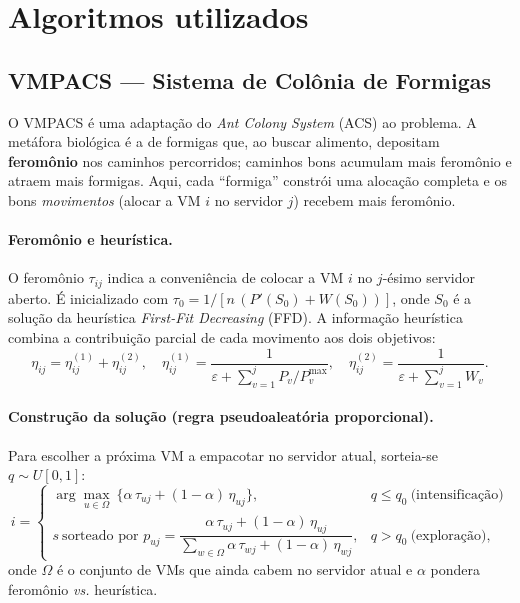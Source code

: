 \documentclass[11pt]{article}
\begin{document}
\section{Algoritmos utilizados}
\subsection{VMPACS --- Sistema de Colônia de Formigas}
O VMPACS é uma adaptação do \emph{Ant Colony System} (ACS) ao problema. A
metáfora biológica é a de formigas que, ao buscar alimento, depositam
\textbf{feromônio} nos caminhos percorridos; caminhos bons acumulam mais
feromônio e atraem mais formigas. Aqui, cada ``formiga'' constrói uma alocação
completa e os bons \emph{movimentos} (alocar a VM $i$ no servidor $j$) recebem
mais feromônio.

\paragraph{Feromônio e heurística.} O feromônio $\tau_{ij}$ indica a
conveniência de colocar a VM $i$ no $j$-ésimo servidor aberto. É inicializado com
$\tau_{0}=1/\!\left[n\,(P'(S_{0})+W(S_{0}))\right]$, onde $S_{0}$ é a solução da
heurística \emph{First-Fit Decreasing} (FFD). A informação heurística combina a
contribuição parcial de cada movimento aos dois objetivos:
\begin{equation}
  \eta_{ij}=\eta_{ij}^{(1)}+\eta_{ij}^{(2)},\quad
  \eta_{ij}^{(1)}=\frac{1}{\varepsilon+\sum_{v=1}^{j} P_{v}/P^{\max}_{v}},\quad
  \eta_{ij}^{(2)}=\frac{1}{\varepsilon+\sum_{v=1}^{j} W_{v}}.
  \label{eq:eta}
\end{equation}

\paragraph{Construção da solução (regra pseudoaleatória proporcional).} Para
escolher a próxima VM a empacotar no servidor atual, sorteia-se $q\sim U[0,1]$:
\begin{equation}
  i=\begin{cases}
     \displaystyle\arg\max_{u\in\Omega}\ \{\alpha\,\tau_{uj}+(1-\alpha)\,\eta_{uj}\}, & q\le q_{0}\ \text{(intensificação)}\\[6pt]
     s\ \text{sorteado por } p_{uj}=\dfrac{\alpha\,\tau_{uj}+(1-\alpha)\,\eta_{uj}}{\sum_{w\in\Omega}\alpha\,\tau_{wj}+(1-\alpha)\,\eta_{wj}}, & q> q_{0}\ \text{(exploração),}
    \end{cases}
  \label{eq:regra}
\end{equation}
onde $\Omega$ é o conjunto de VMs que ainda cabem no servidor atual e $\alpha$
pondera feromônio \emph{vs.} heurística.
\end{document}
